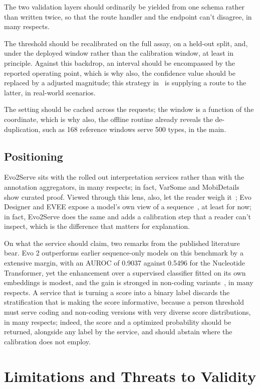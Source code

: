 \documentclass[10pt,journal]{IEEEtran}
\begin{document}
The two validation layers should ordinarily be yielded from one schema rather than written twice, so that the route handler and the endpoint can't disagree, in many respects.

The threshold should be recalibrated on the full assay, on a held-out split, and, under the deployed window rather than the calibration window, at least in principle. Against this backdrop, an interval should be encompassed by the reported operating point, which is why also, the confidence value should be replaced by a adjusted magnitude; this strategy in~\cite{pejaver2022svi} is supplying a route to the latter, in real-world scenarios.

The setting should be cached across the requests; the window is a function of the coordinate, which is why also, the offline routine already reveals the de-duplication, such as 168 reference windows serve 500 types, in the main.

\subsection{Positioning}
Evo2Serve sits with the rolled out interpretation services rather than with the annotation aggregators, in many respects; in fact, VarSome and MobiDetails show curated proof. Viewed through this lens, also, let the reader weigh it~\cite{vandenbroucke2019varsome,baux2021mobidetails}; Evo Designer and EVEE expose a model's own view of a sequence~\cite{pearce2026evee}, at least for now; in fact, Evo2Serve does the same and adds a calibration step that a reader can't inspect, which is the difference that matters for explanation.

On what the service should claim, two remarks from the published literature bear. Evo 2 outperforms earlier sequence-only models on this benchmark by a extensive margin, with an AUROC of 0.9037 against 0.5496 for the Nucleotide Transformer, yet the enhancement over a supervised classifier fitted on its own embeddings is modest, and the gain is stronged in non-coding variants~\cite{brixi2026evo2}, in many respects. A service that is turning a score into a binary label discards the stratification that is making the score informative, because a person threshold must serve coding and non-coding versions with very diverse score distributions, in many respects; indeed, the score and a optimized probability should be returned, alongside any label by the service, and should abstain where the calibration does not employ.

\section{Limitations and Threats to Validity}
\label{sec:limits}
\end{document}
